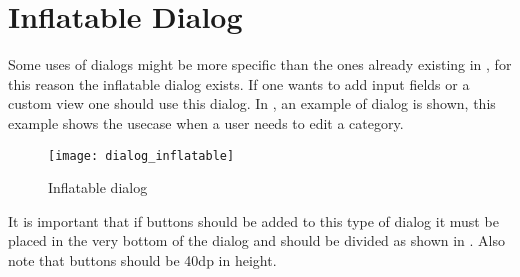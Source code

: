 \section{Inflatable Dialog}
\label{sec:inflatable_dialog}

Some uses of dialogs might be more specific than the ones already existing in \gc, for this reason the inflatable dialog exists. If one wants to add input fields or a custom view one should use this dialog. In , an example of dialog is shown, this example shows the usecase when a user needs to edit a category.

\begin{figure}[h]
	\centering
	\texttt{[image: dialog\_inflatable]}
	\caption{Inflatable dialog}
	\label{fig:inflatable_dialog}
\end{figure}
\FloatBarrier

\begin{note}
	It is important that if buttons should be added to this type of dialog it must be placed in the very bottom of the dialog and should be divided as shown in . Also note that buttons should be 40dp in height.
\end{note}

